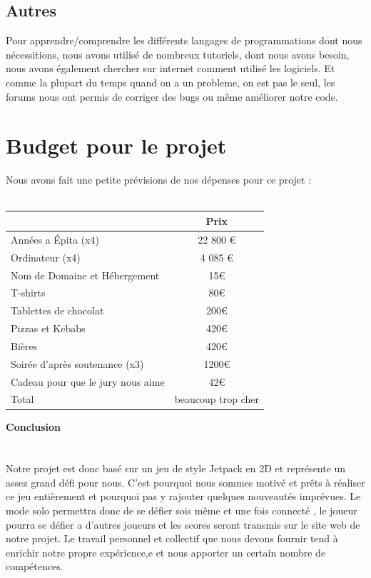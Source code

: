 \documentclass [11pt]{report}
\begin{document}
	\section {Autres}

	Pour apprendre/comprendre les différents langages de programmations dont nous nécessitions, nous avons utilisé de nombreux tutoriels, dont nous avons besoin, nous avons également chercher sur internet comment utilisé les logiciels. Et comme la plupart du temps quand on a un probleme, on est pas le seul, les forums nous ont permis de corriger des bugs ou même améliorer notre code.


\chapter {Budget pour le projet}
	Nous avons fait une petite prévisions de nos dépenses pour ce projet :\\\\

				\begin{tabular}{|l|c|}
				\hline
		 		 & Prix \\
				\hline
				Années a \'Epita (x4) & 22 800 € \\
				\hline
				Ordinateur (x4) & 4 085 €  \\
				\hline
				Nom de Domaine et Hébergement &  15€ \\
				\hline
				T-shirts & 80€ \\
				\hline
				Tablettes de chocolat & 200€ \\
				\hline
				Pizzas et Kebabs & 420€  \\
				\hline
				Bières  & 420€   \\
	          			 \hline
				Soirée d'après soutenance (x3) & 1200€\\
				\hline 
				Cadeau pour que le jury nous aime & 42€ \\
				\hline
				Total & beaucoup trop cher \\
				\hline
				
			\end{tabular}
\newpage
\textbf{{\Huge Conclusion}}\\
\\
\\\indent	Notre projet est donc basé sur un jeu de style Jetpack en 2D et représente un assez grand défi pour nous. C’est pourquoi nous sommes motivé et prêts à réaliser ce jeu entièrement et pourquoi pas y rajouter quelques nouveautés imprévues. Le mode solo permettra donc de se défier sois même et une fois connecté , le joueur pourra se défier a d’autres joueurs et les scores seront transmis sur le site web de notre projet. Le travail personnel et collectif que nous devons fournir tend à enrichir notre propre expérience,e et nous apporter un certain nombre de comp\'etences.
\end{document}
